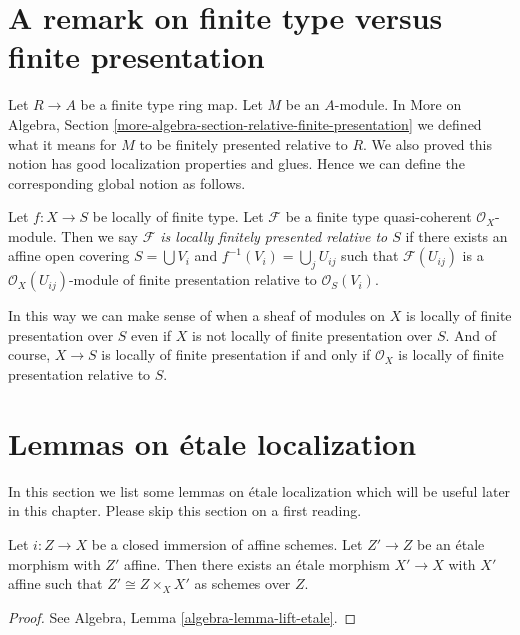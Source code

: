 \section{A remark on finite type versus finite presentation}
\label{section-finite-type-finite-presentation}

\noindent
Let $R \to A$ be a finite type ring map. Let $M$ be an $A$-module. In
More on Algebra,
Section \ref{more-algebra-section-relative-finite-presentation}
we defined what it means for $M$ to be finitely presented relative to $R$.
We also proved this notion has good localization properties and glues.
Hence we can define the corresponding global notion as follows.

\begin{definition}
\label{definition-relatively-finitely-presented-sheaf}
Let $f : X \to S$ be locally of finite type.
Let $\mathcal{F}$ be a finite type quasi-coherent $\mathcal{O}_X$-module.
Then we say {\it $\mathcal{F}$ is locally finitely presented relative to $S$}
if there exists an affine open covering $S = \bigcup V_i$ and
$f^{-1}(V_i) = \bigcup_j U_{ij}$ such that $\mathcal{F}(U_{ij})$
is a $\mathcal{O}_X(U_{ij})$-module of finite presentation relative
to $\mathcal{O}_S(V_i)$.
\end{definition}

\noindent
In this way we can make sense of when a sheaf of modules on $X$ is
locally of finite presentation over $S$ even if $X$ is not locally
of finite presentation over $S$. And of course, $X \to S$ is locally
of finite presentation if and only if $\mathcal{O}_X$ is locally
of finite presentation relative to $S$.


\section{Lemmas on \'etale localization}
\label{section-etale-localization}

\noindent
In this section we list some lemmas on \'etale localization which will be
useful later in this chapter. Please skip this section on a first reading.

\begin{lemma}
\label{lemma-lift-etale}
Let $i : Z \to X$ be a closed immersion of affine schemes.
Let $Z' \to Z$ be an \'etale morphism with $Z'$ affine.
Then there exists an \'etale morphism $X' \to X$ with $X'$
affine such that $Z' \cong Z \times_X X'$ as schemes over $Z$.
\end{lemma}

\begin{proof}
See
Algebra, Lemma \ref{algebra-lemma-lift-etale}.
\end{proof}

